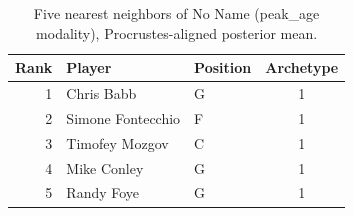\begin{table}[htbp]
  \centering\small
  \begin{tabular}{rllc}
    \toprule
    Rank & Player & Position & Archetype \\
    \midrule
    1 & Chris Babb & G & 1 \\
    2 & Simone Fontecchio & F & 1 \\
    3 & Timofey Mozgov & C & 1 \\
    4 & Mike Conley & G & 1 \\
    5 & Randy Foye & G & 1 \\
    \bottomrule
  \end{tabular}
  \caption{Five nearest neighbors of No Name (peak_age modality), Procrustes-aligned posterior mean.}
  \label{tab:No_Name_neighbors_peak_age}
\end{table}

